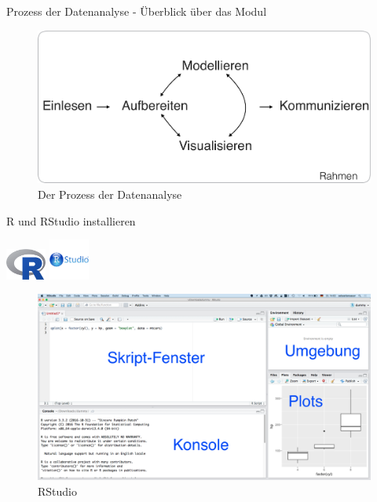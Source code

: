 \begin{frame}{Prozess der Datenanalyse - Überblick über das Modul}

\begin{figure}

{\centering \includegraphics[width=0.8\linewidth]{../images/Rahmen/Prozess_Datenanalyse} 

}

\caption{Der Prozess der Datenanalyse}\label{fig:fig-prozess}
\end{figure}

\end{frame}

\begin{frame}{R und RStudio installieren}

\includegraphics[width=0.10000\textwidth]{../images/Rahmen/Rlogo.png}
\includegraphics[width=0.10000\textwidth]{../images/Rahmen/rstudiologo.png}

\begin{figure}

{\centering \includegraphics[width=0.5\linewidth]{../images/Rahmen/RStudio-Screenshot} 

}

\caption{RStudio}\label{fig:unnamed-chunk-1}
\end{figure}

\end{frame}

